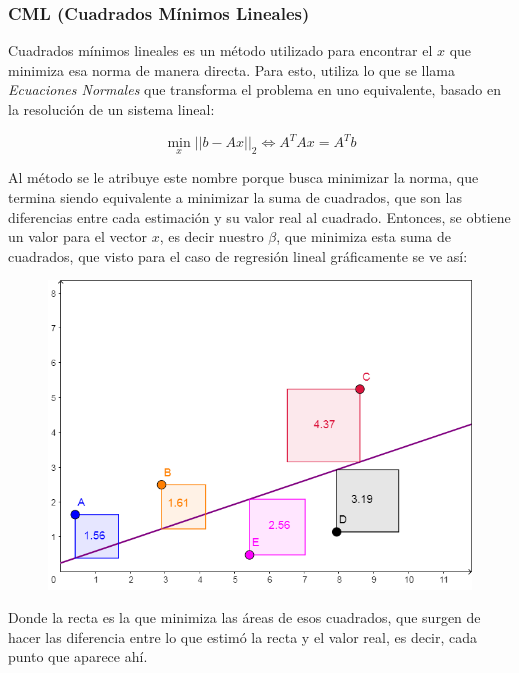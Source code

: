     \subsubsection{CML (Cuadrados Mínimos Lineales)}
    
    Cuadrados mínimos lineales es un método utilizado para encontrar el $x$ que minimiza esa norma de manera directa. Para esto, utiliza lo que se llama \textit{Ecuaciones Normales} que transforma el problema en uno equivalente, basado en la resolución de un sistema lineal:
    
    \[ \min_x  ||b - Ax||_2 \iff A^T A x = A^T b\]
    
    Al método se le atribuye este nombre porque busca minimizar la norma, que termina siendo equivalente a minimizar la suma de cuadrados, que son las diferencias entre cada estimación y su valor real al cuadrado. Entonces, se obtiene un valor para el vector $x$, es decir nuestro $\beta$, que minimiza esta suma de cuadrados, que visto para el caso de regresión lineal gráficamente se ve así:
    
    \begin{figure}[H]
        \begin{center}
            \includegraphics[scale=0.4]{img/explicaciones/CML-Line.png}
            \end{center}
    \end{figure}
    
    Donde la recta es la que minimiza las áreas de esos cuadrados, que surgen de hacer las diferencia entre lo que estimó la recta y el valor real, es decir, cada punto que aparece ahí.
   